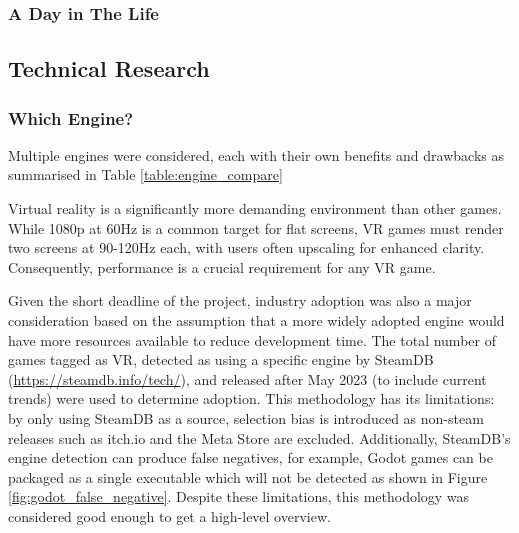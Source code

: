 \documentclass[sigconf,authordraft]{acmart}
\begin{document}
\subsubsection{A Day in The Life}

\subsection{Technical Research}

\subsubsection{Which Engine?}

Multiple engines were considered, each with their own benefits
and drawbacks as summarised in Table \ref{table:engine_compare}

Virtual reality is a significantly more demanding environment than other games.
While 1080p at 60Hz is a common target for flat screens, VR games must render
two screens at 90-120Hz each, with users often upscaling for enhanced clarity.
Consequently, performance is a crucial requirement for any VR game.

Given the short deadline of the project, industry adoption was also a major
consideration based on the assumption that a more widely adopted engine would
have more resources available to reduce development time. The total number of
games tagged as VR, detected as using a specific engine by
SteamDB (\url{https://steamdb.info/tech/}), and released
after May 2023 (to include current trends) were used to determine adoption.
This methodology has its limitations: by only using SteamDB as a source,
selection bias is introduced as non-steam releases such as itch.io and the Meta
Store are excluded. Additionally, SteamDB's engine detection can produce false
negatives, for example, Godot games can be packaged as a single executable which
will not be detected as shown in Figure \ref{fig:godot_false_negative}. Despite
these limitations, this methodology was considered good enough to get a
high-level overview.
\end{document}
